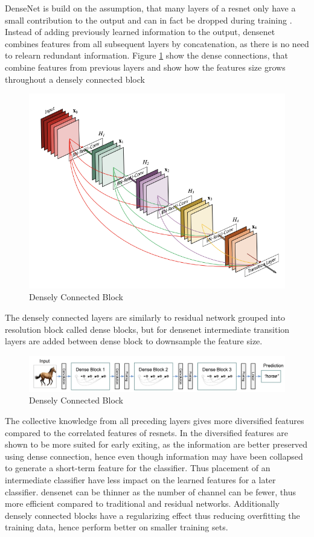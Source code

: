 DenseNet \cite{huang_densely_2016} is build on the assumption, that many layers of a \gls{resnet} only have a small contribution to the output and can in fact be dropped during training \cite{huang_densely_2016}. Instead of adding previously learned information to the output, \gls{densenet} combines features from all subsequent layers by concatenation, as there is no need to relearn redundant information. Figure \ref{fig:denseblock} show the dense connections, that combine features from previous layers and show how the features size grows throughout a densely connected block

\begin{figure}
	\centering
	\includegraphics[width=.5\linewidth]{figures/models/denseblock}
	\caption[Densely Connected Block]{Densely Connected Block}
	\label{fig:denseblock}
\end{figure}

The densely connected layers are similarly to residual network grouped into resolution block called dense blocks, but for \gls{densenet} intermediate transition layers are added between dense block to downsample the feature size. 

\begin{figure}
	\centering
	\includegraphics[width=\linewidth]{figures/models/densenet}
	\caption[Densely Connected Block]{Densely Connected Block}
	\label{fig:densenet}
\end{figure}

The collective knowledge from all preceding layers gives more diversified features compared to the correlated features of \gls{resnet}s. In \cite{huang_multi-scale_2017} the diversified features are shown to be more suited for early exiting,  as the information are better preserved using dense connection, hence even though information may have been collapsed to generate a short-term feature for the classifier. Thus placement of an intermediate classifier have less impact on the learned features for a later classifier. \gls{densenet} can be thinner as the number of channel can be fewer, thus more efficient compared to traditional and residual networks. Additionally densely connected blocks have a regularizing effect thus reducing overfitting the training data, hence perform better on smaller training sets. 

